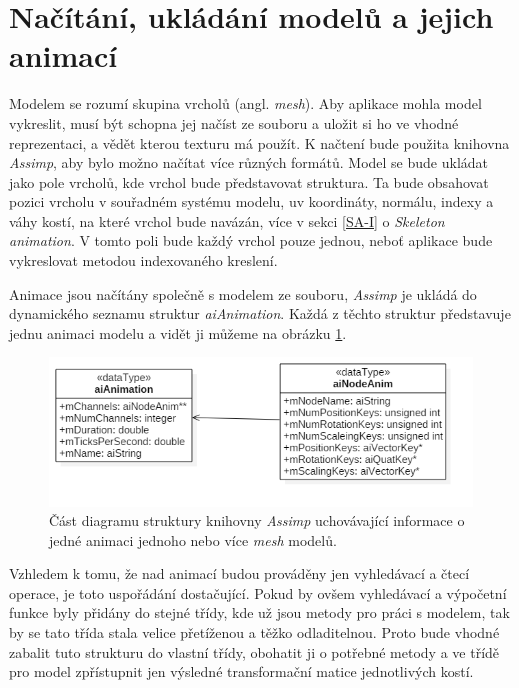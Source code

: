 \section{Načítání, ukládání modelů a jejich animací}

Modelem se rozumí skupina vrcholů (angl. \emph{mesh}). Aby aplikace mohla model vykreslit, musí být schopna jej načíst ze souboru a uložit si ho ve vhodné reprezentaci, a vědět kterou texturu má použít. K načtení bude použita knihovna \emph{Assimp}\cite{assimp}, aby bylo možno načítat více různých formátů. Model se bude ukládat jako pole vrcholů, kde vrchol bude představovat struktura. Ta bude obsahovat pozici vrcholu v souřadném systému modelu, uv koordináty, normálu, indexy a váhy kostí, na které vrchol bude navázán, více v sekci \ref{SA-I} o \emph{Skeleton animation}. V tomto poli bude každý vrchol pouze jednou, neboť aplikace bude vykreslovat metodou indexovaného kreslení.
    
Animace jsou načítány společně s modelem ze souboru, \emph{Assimp} je ukládá do dynamického seznamu struktur \emph{aiAnimation}. Každá z těchto struktur představuje jednu animaci modelu a vidět ji můžeme na obrázku \ref{aiAnimation}. 
\begin{figure}
	\begin{center}
		\includegraphics[scale=0.5]{obrazky-figures/aiAnimation}
		\caption{Část diagramu struktury knihovny \emph{Assimp}\cite{assimp} uchovávající informace o jedné animaci jednoho nebo více \emph{mesh} modelů.}\label{aiAnimation}
\end{center}\end{figure}

Vzhledem k tomu, že nad animací budou prováděny jen vyhledávací a čtecí operace, je toto uspořádání dostačující. Pokud by ovšem vyhledávací a výpočetní funkce byly přidány do stejné třídy, kde už jsou metody pro práci s modelem, tak by se tato třída stala velice přetíženou a těžko odladitelnou. Proto bude vhodné zabalit tuto strukturu do vlastní třídy, obohatit ji o potřebné metody a ve třídě pro model zpřístupnit jen výsledné transformační matice jednotlivých kostí.

